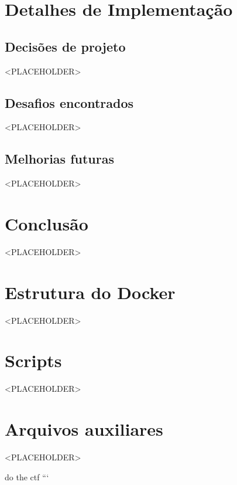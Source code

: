 \section{Detalhes de Implementação}

\subsection{Decisões de projeto}

<PLACEHOLDER>

\subsection{Desafios encontrados}

<PLACEHOLDER>

\subsection{Melhorias futuras}

<PLACEHOLDER>


\section{Conclusão}

<PLACEHOLDER>


\appendix

\section{Estrutura do Docker}

<PLACEHOLDER>

\section{Scripts}

<PLACEHOLDER>

\section{Arquivos auxiliares}

<PLACEHOLDER>




do the ctf 
```
